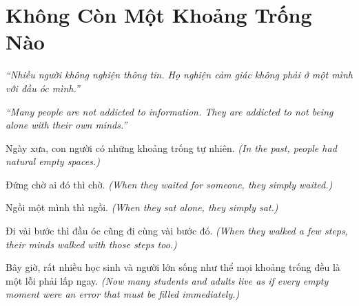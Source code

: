 \chapter{Không Còn Một Khoảng Trống Nào}

\begin{center}
	\textit{\color{bookprimary}``Nhiều người không nghiện thông tin. Họ nghiện cảm giác không phải ở một mình với đầu óc mình.''}

	\textit{\color{bookprimary}``Many people are not addicted to information. They are addicted to not being alone with their own minds.''}
\end{center}

\ngancach

\begin{tcolorbox}[colback=bookprimary!6,colframe=bookprimary!35,arc=5pt,title={\bfseries Góc Suy Nghĩ},fonttitle=\bfseries\color{bookprimary}]
Ngày xưa, con người có những khoảng trống tự nhiên.
\textit{(In the past, people had natural empty spaces.)}

Đứng chờ ai đó thì chờ.
\textit{(When they waited for someone, they simply waited.)}

Ngồi một mình thì ngồi.
\textit{(When they sat alone, they simply sat.)}

Đi vài bước thì đầu óc cũng đi cùng vài bước đó.
\textit{(When they walked a few steps, their minds walked with those steps too.)}

Bây giờ, rất nhiều học sinh và người lớn sống như thể mọi khoảng trống đều là một lỗi phải lấp ngay.
\textit{(Now many students and adults live as if every empty moment were an error that must be filled immediately.)}
\end{tcolorbox}

